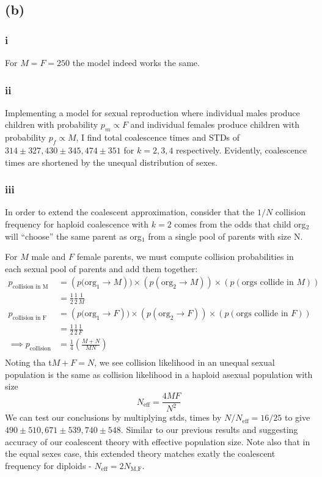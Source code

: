 \documentclass[12pt,draft,a4paper]{article}
\begin{document}
\subsection*{(b)}
\subsubsection*{i}
For $M=F=250$ the model indeed works the same.
\subsubsection*{ii}
Implementing a model for sexual reproduction where individual males produce children with probability $p_m\propto F$ and individual females produce children with probability $p_f\propto M$, I
find total coalescence times and STDs of  $314 \pm 327, 430 \pm 345,474 \pm 351$ for $k=2,3,4$ respectively. Evidently, coalescence times are shortened by the unequal distribution of sexes.
\subsubsection*{iii}
In order to extend the coalescent approximation, consider that the $1/N$ collision frequency for haploid coalescence with $k=2$ comes from the odds that child org$_2$ will ``choose'' the same parent as org$_1$ from a single pool of parents with size N.

For $M$ male and $F$ female parents, we must compute collision probabilities in each sexual pool of parents and add them together:
\begin{align*}
p_{\text{collision in M}} & = \left(p(\text{org}_1 \rightarrow M\right))\times\left(p(\text{org}_2 \rightarrow M)\right)\times\left(p(\text{orgs collide in } M)\right)\\
 &= \frac{1}{2}\frac{1}{2}\frac{1}{M}\\
p_{\text{collision in F}} & = \left(p(\text{org}_1 \rightarrow F\right))\times\left(p(\text{org}_2 \rightarrow F)\right)\times\left(p(\text{orgs collide in } F)\right)\\
 &= \frac{1}{2}\frac{1}{2}\frac{1}{F}\\
\implies p_{\text{collision}} & = \frac{1}{4}\left(\frac{M+N}{MN}\right)\\
\end{align*}
Noting tha t$M+F = N$, we see collision likelihood in an unequal sexual population is the same as collision likelihood in a haploid asexual population with size
\begin{equation} N_{\text{eff}} = \frac{4MF}{N^2} \end{equation}
We can test our conclusions by multiplying stds, times by $N/N_\text{eff} = 16/25$ to give $490 \pm 510, 671 \pm 539, 740 \pm 548$. Similar to our previous results and suggesting accuracy of our coalescent theory with effective population size. Note also that in the equal sexes case, this extended theory matches exatly the coalescent frequency for diploids - $N_{\text{eff}} = 2N_{\text{M,F}}$.


\end{document}
